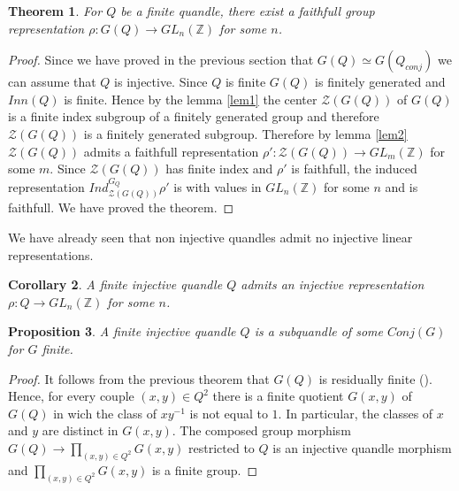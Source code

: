 \documentclass[12pt, reqno]{amsart}
\newtheorem{theorem}{Theorem}[section]
\newtheorem{proposition}[theorem]{Proposition}
\newtheorem{corollary}[theorem]{Corollary}
\newcommand{\Z}{ {\mathbb Z} }
\begin{document}
\begin{theorem}\label{rep}
For $Q$ be a finite quandle, there exist a faithfull group representation $\rho: G(Q)\to GL_n(\Z)$ for some $n$. 
\end{theorem}
\begin{proof}
Since we have proved in the previous section that $G(Q)\simeq G(Q_{conj})$ we can assume that $Q$ is injective. Since $Q$ is finite $G(Q)$ is finitely generated and $Inn(Q)$ is finite. Hence by the lemma \ref{lem1} the center $\mathcal{Z}(G(Q))$ of $G(Q)$ is a finite index subgroup of a finitely generated group and therefore $\mathcal{Z}(G(Q))$ is a finitely generated subgroup. Therefore by lemma \ref{lem2} $\mathcal{Z}(G(Q))$ admits a faithfull representation $\rho' : \mathcal{Z}(G(Q)) \to GL_m(\Z)$ for some $m$. Since  $\mathcal{Z}(G(Q))$ has finite index and $\rho'$ is faithfull, the induced representation $Ind_ {\mathcal{Z}(G(Q))}^{G_Q} \rho'$ is with values in $GL_n(\Z)$ for some $n$ and is faithfull. We have proved the theorem.
\end{proof}
We have already seen that non injective quandles admit no injective linear representations.
\begin{corollary}
A finite injective quandle $Q$ admits an injective representation $\rho : Q\to GL_n(\Z)$ for some $n$. 
\end{corollary}
\begin{proposition}\label{fin}
A finite injective quandle $Q$ is a subquandle of some $Conj(G)$ for $G$ finite.
\end{proposition}
\begin{proof}
It follows from the previous theorem that $G(Q)$ is residually finite (\cite{Mal}). Hence, for every couple $(x,y)\in Q^2$ there is a finite quotient $G(x,y)$ of $G(Q)$ in wich the class of $xy^{-1}$ is not equal to $1$. In particular, the classes of $x$ and $y$ are distinct in $G(x,y)$. The composed group morphism $G(Q) \to \prod_{(x,y)\in Q^2} G(x,y)$ restricted to $Q$ is an injective quandle morphism and $ \prod_{(x,y)\in Q^2} G(x,y)$  is a finite group.
\end{proof}
\end{document}
